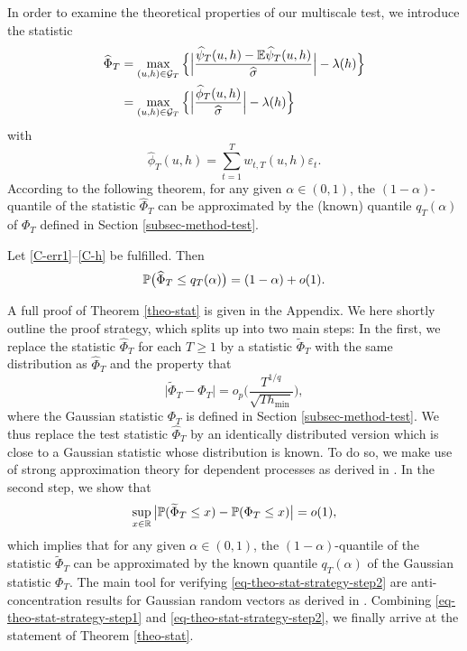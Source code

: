 \documentclass[a4paper,12pt]{article}
\numberwithin{equation}{section}
\begin{document}
In order to examine the theoretical properties of our multiscale test, we introduce the statistic 
\begin{align}
\widehat{\Phi}_T 
 & = \max_{(u,h) \in \mathcal{G}_T} \Big\{ \Big| \frac{\widehat{\psi}_T(u,h) - \mathbb{E} \widehat{\psi}_T(u,h)}{\widehat{\sigma}} \Big| - \lambda(h) \Big\} \nonumber \\
 & = \max_{(u,h) \in \mathcal{G}_T} \Big\{ \Big| \frac{\widehat{\phi}_T(u,h)}{\widehat{\sigma}} \Big| - \lambda(h) \Big\} \label{Phi-hat-statistic}
\end{align}
with 
\[ \widehat{\phi}_T(u,h) = \sum\limits_{t=1}^T w_{t,T}(u,h) \varepsilon_t. \]
According to the following theorem, for any given $\alpha \in (0,1)$, the $(1-\alpha)$-quantile of the statistic $\widehat{\Phi}_T$ can be approximated by the (known) quantile $q_T(\alpha)$ of $\Phi_T$ defined in Section \ref{subsec-method-test}. 
\begin{theorem}\label{theo-stat}
Let \ref{C-err1}--\ref{C-h} be fulfilled. Then 
\[ \mathbb{P} \big( \widehat{\Phi}_T \le q_T(\alpha) \big) = (1 - \alpha) + o(1). \]
\end{theorem}
A full proof of Theorem \ref{theo-stat} is given in the Appendix. 
We here shortly outline the proof strategy, which splits up into two main steps: In the first, we replace the statistic $\widehat{\Phi}_T$ for each $T \ge 1$ by a statistic $\widetilde{\Phi}_T$ with the same distribution as $\widehat{\Phi}_T$ and the property that 
\begin{equation}\label{eq-theo-stat-strategy-step1}
\big| \widetilde{\Phi}_T - \Phi_T \big| = o_p \Big( \frac{T^{1/q}}{\sqrt{T h_{\min}}} \Big),
\end{equation}
where the Gaussian statistic $\Phi_T$ is defined in Section \ref{subsec-method-test}. We thus replace the test statistic $\widehat{\Phi}_T$ by an identically distributed version which is close to a Gaussian statistic whose distribution is known. To do so, we make use of strong approximation theory for dependent processes as derived in \cite{BerkesLiuWu2014}. In the second step, we show that 
\begin{equation}\label{eq-theo-stat-strategy-step2}
\sup_{x \in \mathbb{R}} \big| \mathbb{P}(\widetilde{\Phi}_T \le x) - \mathbb{P}(\Phi_T \le x) \big| = o(1), 
\end{equation}
which implies that for any given $\alpha \in (0,1)$, the $(1-\alpha)$-quantile of the statistic $\widetilde{\Phi}_T$ can be approximated by the known quantile $q_T(\alpha)$ of the Gaussian statistic $\Phi_T$. The main tool for verifying \eqref{eq-theo-stat-strategy-step2} are anti-concentration results for Gaussian random vectors as derived in \cite{Chernozhukov2015}. Combining \eqref{eq-theo-stat-strategy-step1} and \eqref{eq-theo-stat-strategy-step2}, we finally arrive at the statement of Theorem \ref{theo-stat}. 
\end{document}
